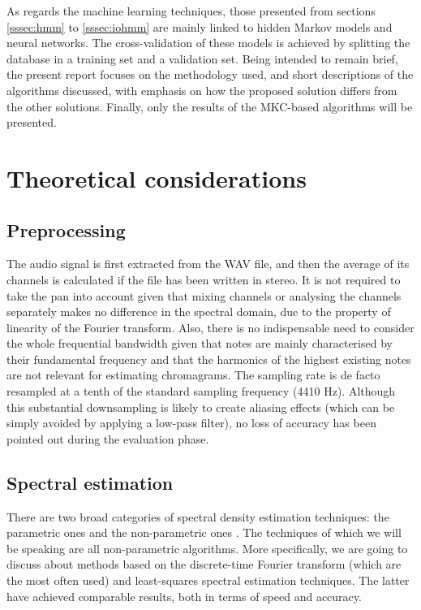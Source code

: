 \documentclass[letterpaper]{article}
\begin{document}
As regards the machine learning techniques, those presented from sections \ref{sssec:hmm} to \ref{sssec:iohmm}
are mainly linked to hidden Markov models and neural networks. The cross-validation of these models is achieved by splitting
the database in a training set and a validation set. Being intended to remain brief, the present report focuses on the methodology used,
and short descriptions of the algorithms discussed, with emphasis on how the proposed solution differs from the other solutions. Finally, only the results of the MKC-based algorithms will be presented.

\section{Theoretical considerations}

\subsection{Preprocessing}

The audio signal is first extracted from the WAV file, and then the average of its channels is calculated
if the file has been written in stereo. It is not required to take the pan into account given that mixing
channels or analysing the channels separately makes no difference in the spectral domain, due to the property of linearity of the Fourier transform. Also, there is
no indispensable need to consider the whole frequential bandwidth given that notes are mainly characterised 
by their fundamental frequency
and that the harmonics of the highest existing notes are not relevant for estimating chromagrams.
The sampling rate is de facto resampled at a tenth of the standard sampling frequency (4410 Hz).
Although this substantial downsampling is likely to create aliasing effects (which can be simply avoided by 
applying a low-pass filter), no loss of accuracy has been pointed out during the evaluation phase.

\subsection{Spectral estimation}

There are two broad categories of spectral density estimation techniques: the parametric ones and the non-parametric ones \citep{MHH}. The techniques
of which we will be speaking are all non-parametric algorithms. More specifically, we are going to discuss about methods based on the discrete-time Fourier transform (which are the most often used) and least-squares spectral estimation techniques. The latter have achieved comparable results, both in terms of speed and accuracy.
\end{document}

